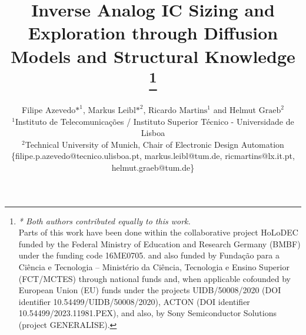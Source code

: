 \documentclass[conference]{IEEEtran}
\begin{document}

\title{Inverse Analog IC Sizing and Exploration through Diffusion Models and Structural Knowledge
\thanks{%
\textit{* Both authors contributed equally to this work.}\\
Parts of this work have been done within the collaborative project HoLoDEC funded by the Federal Ministry of Education and Research Germany (BMBF) under the funding code 16ME0705. and also funded by Fundação para a Ciência e Tecnologia – Ministério da Ciência, Tecnologia e Ensino Superior (FCT/MCTES) through national funds and, when applicable cofounded by European Union (EU) funds under the projects UIDB/50008/2020 (DOI identifier 10.54499/UIDB/50008/2020), ACTON (DOI identifier 10.54499/2023.11981.PEX), and also, by Sony Semiconductor Solutions (project GENERALISE).}}

\author{\small  Filipe $\text{Azevedo*}^{\text{1}}$, Markus $\text{Leibl*}^{\text{2}}$, Ricardo $\text{Martins}^{\text{1}}$ and Helmut $\text{Graeb}^{\text{2}}$\\ 
$^1$Instituto de Telecomunicações / Instituto Superior Técnico - Universidade de Lisboa\\
$^2$Technical University of Munich, Chair of Electronic Design Automation\\
\{filipe.p.azevedo@tecnico.ulisboa.pt, markus.leibl@tum.de, ricmartins@lx.it.pt, helmut.graeb@tum.de\}}



\maketitle
\end{document}
